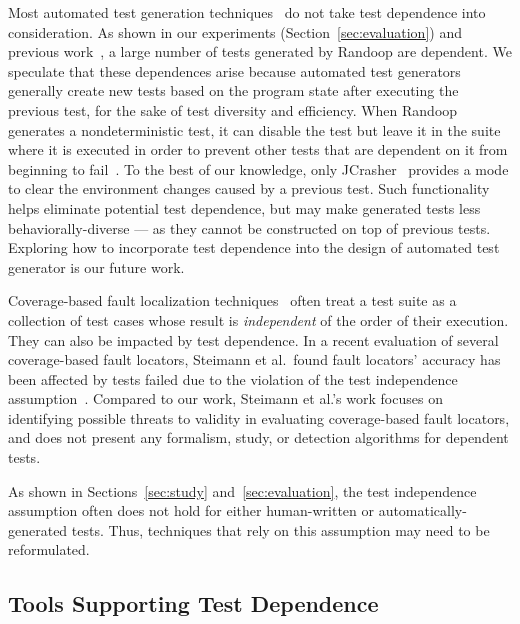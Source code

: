 Most automated test generation
techniques~\cite{PachecoLET2007, Wang:2007:AGC,
ZhangSBE2011} do not take test dependence
into consideration. As shown in our experiments
(Section~\ref{sec:evaluation}) and previous work~\cite{RobinsonEPAL2011},
a large number of tests generated by Randoop are dependent.
We speculate that these dependences arise because automated
test generators generally create new tests
based on the program state after executing the previous test,
for the sake of test diversity and efficiency. 
When Randoop generates a nondeterministic test, it can disable the test but
leave it in the suite where it is executed in order to prevent other tests
that are dependent on it from beginning to fail~\cite{RobinsonEPAL2011}.
To the best of our knowledge, only JCrasher~\cite{Csallner:2004}
provides a mode to clear the environment changes caused
by a previous test. Such functionality helps eliminate
potential test dependence, but may make generated
tests less behaviorally-diverse --- as they cannot be constructed
on top of previous tests. Exploring how to
incorporate test dependence into the design of automated
test generator is our future work.

Coverage-based fault localization techniques~\cite{Jones:2002:VTI}
often treat a test suite as a collection of test cases
whose result is \textit{independent} of the order of their
execution. They can also be impacted by test dependence.
In a recent evaluation of several coverage-based fault locators,
 Steimann et al.\ found fault locators' accuracy has been 
 affected by tests failed due to the violation of the test
 independence assumption~\cite{Steimann:2013}. 
 Compared to our work, Steimann et al.'s
 work focuses on identifying possible threats to validity
 in evaluating coverage-based fault locators, and does
 not present any formalism, study, or detection algorithms
 for dependent tests.



As shown in Sections~\ref{sec:study} and~\ref{sec:evaluation},
the test independence assumption often does not hold for either
human-written or automatically-generated tests. Thus, techniques
that rely on this assumption may need to be reformulated.

\subsection{Tools Supporting Test Dependence}
\label{sec:supporting}

